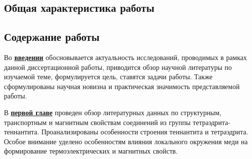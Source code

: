 \subsection*{Общая характеристика работы}

\newcommand{\actuality}{\underline{\textbf{Актуальность темы.}}}
\newcommand{\aim}{\underline{\textbf{Целью}}}
\newcommand{\tasks}{\underline{\textbf{задачи}}}
\newcommand{\defpositions}{\underline{\textbf{Основные положения, выносимые на~защиту:}}}
\newcommand{\novelty}{\underline{\textbf{Научная новизна:}}}
\newcommand{\influence}{\underline{\textbf{Научная и практическая значимость}}}
\newcommand{\reliability}{\underline{\textbf{Достоверность}}}
\newcommand{\probation}{\underline{\textbf{Апробация работы.}}}
\newcommand{\contribution}{\underline{\textbf{Личный вклад.}}}
\newcommand{\publications}{\underline{\textbf{Публикации.}}}






\subsection*{Содержание работы}
Во \underline{\textbf{введении}} обосновывается актуальность исследований, проводимых в рамках данной диссертационной работы, приводится обзор научной литературы по изучаемой теме, формулируется цель, ставятся задачи работы. Также сформулированы научная новизна и практическая значимость представляемой работы.

В \underline{\textbf{первой главе}} проведен обзор литературных данных по структурным, транспортным и магнитным свойствам соединений из группы тетраэдрита-теннантита. Проанализированы особенности строения теннантита и тетраэдрита. Особое внимание уделено особенностям влияния локального окружения меди на формирование термоэлектрических и магнитных свойств.

